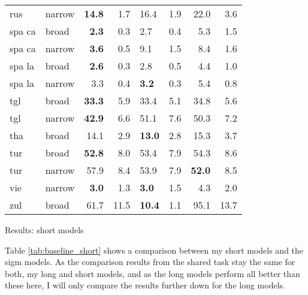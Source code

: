 {\begin{tabularx}{\textwidth}{|l|X||r|r||X|X||r|r|}
rus    & narrow & \textbf{14.8} & 1.7  & 16.4 & 1.9  & 22.0 & 3.6  \\
spa ca & broad  & \textbf{2.3}  & 0.3  & 2.7  & 0.4  & 5.3  & 1.5  \\
spa ca & narrow & \textbf{3.6}  & 0.5  & 9.1  & 1.5  & 8.4  & 1.6  \\
spa la & broad  & \textbf{2.6}  & 0.3  & 2.8  & 0.5  & 4.4  & 1.0  \\
spa la & narrow & 3.3  & 0.4  & \textbf{3.2}  & 0.3  & 5.4  & 0.8  \\
tgl    & broad  & \textbf{33.3} & 5.9  & 33.4 & 5.1  & 34.8 & 5.6  \\
tgl    & narrow & \textbf{42.9} & 6.6  & 51.1 & 7.6  & 50.3 & 7.2  \\
tha    & broad  & 14.1 & 2.9  & \textbf{13.0} & 2.8  & 15.3 & 3.7  \\
tur    & broad  & \textbf{52.8} & 8.0  & 53.4 & 7.9  & 54.3 & 8.6  \\
tur    & narrow & 57.9 & 8.4  & 53.9 & 7.9  & \textbf{52.0} & 8.5  \\
vie    & narrow & \textbf{3.0}  & 1.3  & \textbf{3.0}  & 1.5  & 4.3  & 2.0  \\
zul    & broad  & 61.7 & 11.5 & \textbf{10.4} & 1.1  & 95.1 & 13.7 \\ \hline
\end{tabularx}
}{Results: short models}

Table \ref{tab:baseline_short} shows a comparison between my short models and the \ac{sigm} models. As the comparison results from the shared task stay the same for both, my long and short models, and as the long models perform all better than these here, I will only compare the results further down for the long models.

